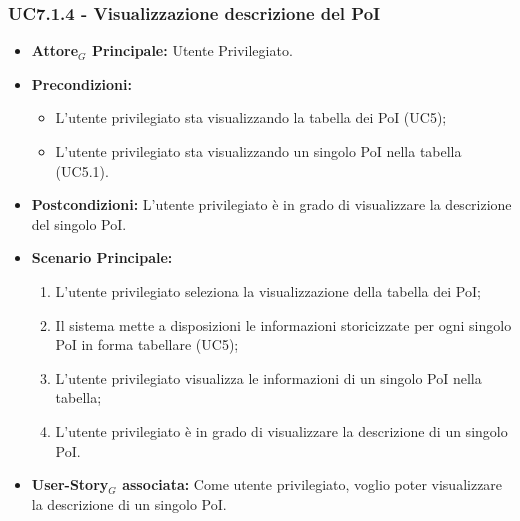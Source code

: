 \documentclass[11pt]{article}
\begin{document}
\begin{justify}
\subsubsection{\textbf{UC7.1.4 - Visualizzazione descrizione del PoI}}
\label{UC7.1.4}
\begin{itemize}
    \item \textbf{Attore$_G$ Principale:} Utente Privilegiato.
    \item \textbf{Precondizioni:} 
        \begin{itemize}
          \item L'utente privilegiato sta visualizzando la tabella dei PoI (UC5);
            \item L'utente privilegiato sta visualizzando un singolo PoI nella tabella (UC5.1).
        \end{itemize}
      \item \textbf{Postcondizioni:} L'utente privilegiato è in grado di visualizzare la descrizione del singolo PoI.
    \item \textbf{Scenario Principale:} 
        \begin{enumerate}
        \item L'utente privilegiato seleziona la visualizzazione della tabella dei PoI;
          \item Il sistema mette a disposizioni le informazioni storicizzate per ogni singolo PoI in forma tabellare (UC5);
          \item L'utente privilegiato visualizza le informazioni di un singolo PoI nella tabella;
            \item L'utente privilegiato è in grado di visualizzare la descrizione di un singolo PoI.
        \end{enumerate}
    \item \textbf{User-Story$_G$ associata:} Come utente privilegiato, voglio poter visualizzare la descrizione di un singolo PoI.
\end{itemize}

\end{justify}
\end{document}
